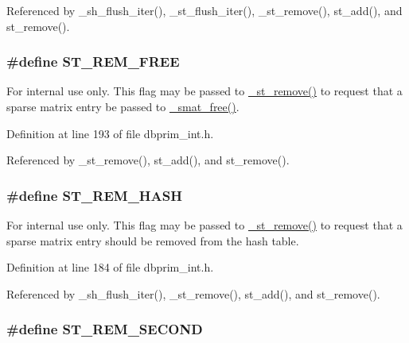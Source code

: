 Referenced by \_\-sh\_\-flush\_\-iter(), \_\-st\_\-flush\_\-iter(), \_\-st\_\-remove(), st\_\-add(), and st\_\-remove().\hypertarget{group__dbprim__smat_ga69}{
\subsubsection[ST\_\-REM\_\-FREE]{\setlength{\rightskip}{0pt plus 5cm}\#define ST\_\-REM\_\-FREE}}
\label{group__dbprim__smat_ga69}


\begin{Desc}
\item[For internal use only.]
This flag may be passed to \hyperlink{group__dbprim__smat_ga23}{\_\-st\_\-remove()} to request that a sparse matrix entry be passed to \hyperlink{group__dbprim__smat_ga25}{\_\-smat\_\-free()}.\end{Desc}


Definition at line 193 of file dbprim\_\-int.h.

Referenced by \_\-st\_\-remove(), st\_\-add(), and st\_\-remove().\hypertarget{group__dbprim__smat_ga68}{
\subsubsection[ST\_\-REM\_\-HASH]{\setlength{\rightskip}{0pt plus 5cm}\#define ST\_\-REM\_\-HASH}}
\label{group__dbprim__smat_ga68}


\begin{Desc}
\item[For internal use only.]
This flag may be passed to \hyperlink{group__dbprim__smat_ga23}{\_\-st\_\-remove()} to request that a sparse matrix entry should be removed from the hash table.\end{Desc}


Definition at line 184 of file dbprim\_\-int.h.

Referenced by \_\-sh\_\-flush\_\-iter(), \_\-st\_\-remove(), st\_\-add(), and st\_\-remove().\hypertarget{group__dbprim__smat_ga67}{
\subsubsection[ST\_\-REM\_\-SECOND]{\setlength{\rightskip}{0pt plus 5cm}\#define ST\_\-REM\_\-SECOND}}
\label{group__dbprim__smat_ga67}


